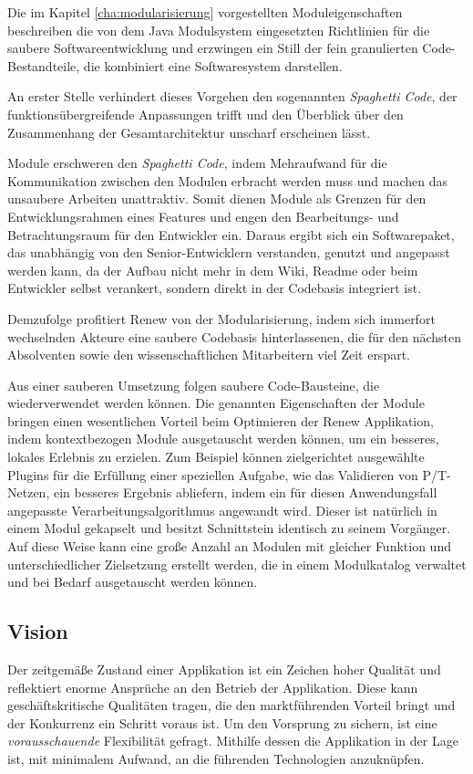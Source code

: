 Die im Kapitel \ref{cha:modularisierung} vorgestellten Moduleigenschaften beschreiben die von dem Java Modulsystem eingesetzten Richtlinien für die saubere Softwareentwicklung und erzwingen ein Still der fein granulierten Code-Bestandteile, die kombiniert eine Softwaresystem darstellen. \newline

An erster Stelle verhindert dieses Vorgehen den sogenannten \textit{Spaghetti Code}, der funktionsübergreifende Anpassungen trifft und den Überblick über den Zusammenhang der Gesamtarchitektur unscharf erscheinen lässt.  \newline

Module erschweren den \textit{Spaghetti Code}, indem Mehraufwand für die Kommunikation zwischen den Modulen erbracht werden muss und machen das unsaubere Arbeiten unattraktiv. Somit dienen Module als Grenzen für den Entwicklungsrahmen eines Features und engen den Bearbeitungs- und Betrachtungsraum für den Entwickler ein. Daraus ergibt sich ein Softwarepaket, das unabhängig von den Senior-Entwicklern verstanden, genutzt und angepasst werden kann, da der Aufbau nicht mehr in dem Wiki, Readme oder beim Entwickler selbst verankert, sondern direkt in der Codebasis integriert ist.  \newline

Demzufolge profitiert Renew von der Modularisierung, indem sich immerfort wechselnden Akteure eine saubere Codebasis hinterlassenen, die für den nächsten Absolventen sowie den wissenschaftlichen Mitarbeitern viel Zeit erspart. \bigbreak

Aus einer sauberen Umsetzung folgen saubere Code-Bausteine, die wiederverwendet werden können. Die genannten Eigenschaften der Module bringen einen wesentlichen Vorteil beim Optimieren der Renew Applikation, indem kontextbezogen Module ausgetauscht werden können, um ein besseres, lokales Erlebnis zu erzielen. Zum Beispiel können zielgerichtet ausgewählte Plugins für die Erfüllung einer speziellen Aufgabe, wie das Validieren von P/T-Netzen, ein besseres Ergebnis abliefern, indem ein für diesen Anwendungsfall angepasste Verarbeitungsalgorithmus angewandt wird. Dieser ist natürlich in einem Modul gekapselt und besitzt Schnittstein identisch zu seinem Vorgänger. Auf diese Weise kann eine große Anzahl an Modulen mit gleicher Funktion und unterschiedlicher Zielsetzung erstellt werden, die in einem Modulkatalog verwaltet und bei Bedarf ausgetauscht werden können.

\subsection{Vision} \label{sub:moderner_zustand}
Der zeitgemäße Zustand einer Applikation ist ein Zeichen hoher Qualität und reflektiert enorme Ansprüche an den Betrieb der Applikation. Diese kann geschäftskritische Qualitäten tragen, die den marktführenden Vorteil bringt und der Konkurrenz ein Schritt voraus ist. Um den Vorsprung zu sichern, ist eine \textit{vorausschauende} Flexibilität gefragt. Mithilfe dessen die Applikation in der Lage ist, mit minimalem Aufwand, an die führenden Technologien anzuknüpfen. 

